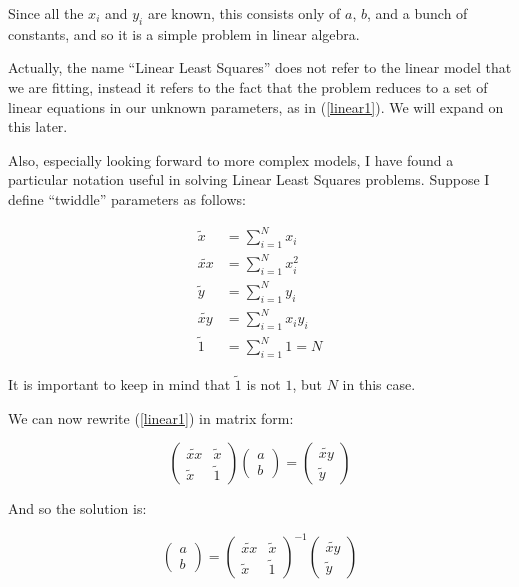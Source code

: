 \documentclass[letterpaper,12pt]{article}
\begin{document}
Since all the $x_i$ and $y_i$ are known, this consists only of $a$, $b$, and a bunch of constants, and so it is a simple problem in linear algebra.

Actually, the name ``Linear Least Squares'' does not refer to the linear model that we are fitting, instead it refers to the fact that the problem reduces to a set of linear equations in our unknown parameters, as in (\ref{linear1}). We will expand on this later.

Also, especially looking forward to more complex models, I have found a particular notation useful in solving Linear Least Squares problems. Suppose I define ``twiddle'' parameters as follows:

\begin{equation}
\begin{aligned}
\label{twiddle1}
\widetilde{x}&=\sum_{i=1}^N x_i\\
\widetilde{xx}&=\sum_{i=1}^N x_i^2\\
\widetilde{y}&=\sum_{i=1}^N y_i\\
\widetilde{xy}&=\sum_{i=1}^N x_i y_i\\
\widetilde{1}&=\sum_{i=1}^N 1=N
\end{aligned}
\end{equation}

It is important to keep in mind that $\widetilde{1}$ is not $1$, but $N$ in this case. 

We can now rewrite (\ref{linear1}) in matrix form:

\begin{equation}
\begin{pmatrix}
\widetilde{xx} & \widetilde{x} \\
\widetilde{x} & \widetilde{1}
\end{pmatrix}
\begin{pmatrix}
a \\
b
\end{pmatrix} =
\begin{pmatrix}
\widetilde{xy}  \\
\widetilde{y}
\end{pmatrix}
\end{equation}

And so the solution is:

\begin{equation}
\begin{pmatrix}
a \\
b
\end{pmatrix} =
\begin{pmatrix}
\widetilde{xx} & \widetilde{x} \\
\widetilde{x} & \widetilde{1}
\end{pmatrix} ^{-1}
\begin{pmatrix}
\widetilde{xy}  \\
\widetilde{y}
\end{pmatrix}
\end{equation}
\end{document}
